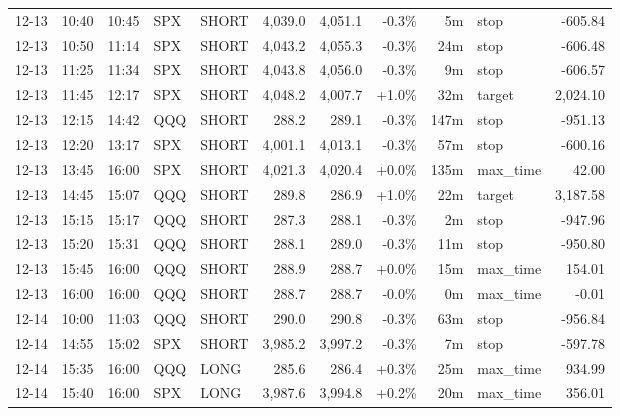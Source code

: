 \documentclass[11pt,a4paper,twoside]{article}
\begin{document}
\begin{center}
\begin{longtable}{>{\color{txtmain}}l l l l l r r r r >{\color{txtmain}}l r}
12-13 & 10:40 & 10:45 & SPX & SHORT & 4,039.0 & 4,051.1 & \textcolor{lossred}{-0.3\%} & 5m & stop & \textcolor{lossred}{-605.84} \\
12-13 & 10:50 & 11:14 & SPX & SHORT & 4,043.2 & 4,055.3 & \textcolor{lossred}{-0.3\%} & 24m & stop & \textcolor{lossred}{-606.48} \\
12-13 & 11:25 & 11:34 & SPX & SHORT & 4,043.8 & 4,056.0 & \textcolor{lossred}{-0.3\%} & 9m & stop & \textcolor{lossred}{-606.57} \\
12-13 & 11:45 & 12:17 & SPX & SHORT & 4,048.2 & 4,007.7 & \textcolor{wingreen}{+1.0\%} & 32m & target & \textcolor{wingreen}{2,024.10} \\
12-13 & 12:15 & 14:42 & QQQ & SHORT & 288.2 & 289.1 & \textcolor{lossred}{-0.3\%} & 147m & stop & \textcolor{lossred}{-951.13} \\
12-13 & 12:20 & 13:17 & SPX & SHORT & 4,001.1 & 4,013.1 & \textcolor{lossred}{-0.3\%} & 57m & stop & \textcolor{lossred}{-600.16} \\
12-13 & 13:45 & 16:00 & SPX & SHORT & 4,021.3 & 4,020.4 & \textcolor{wingreen}{+0.0\%} & 135m & max\_time & \textcolor{wingreen}{42.00} \\
12-13 & 14:45 & 15:07 & QQQ & SHORT & 289.8 & 286.9 & \textcolor{wingreen}{+1.0\%} & 22m & target & \textcolor{wingreen}{3,187.58} \\
12-13 & 15:15 & 15:17 & QQQ & SHORT & 287.3 & 288.1 & \textcolor{lossred}{-0.3\%} & 2m & stop & \textcolor{lossred}{-947.96} \\
12-13 & 15:20 & 15:31 & QQQ & SHORT & 288.1 & 289.0 & \textcolor{lossred}{-0.3\%} & 11m & stop & \textcolor{lossred}{-950.80} \\
12-13 & 15:45 & 16:00 & QQQ & SHORT & 288.9 & 288.7 & \textcolor{wingreen}{+0.0\%} & 15m & max\_time & \textcolor{wingreen}{154.01} \\
12-13 & 16:00 & 16:00 & QQQ & SHORT & 288.7 & 288.7 & \textcolor{lossred}{-0.0\%} & 0m & max\_time & \textcolor{lossred}{-0.01} \\
12-14 & 10:00 & 11:03 & QQQ & SHORT & 290.0 & 290.8 & \textcolor{lossred}{-0.3\%} & 63m & stop & \textcolor{lossred}{-956.84} \\
12-14 & 14:55 & 15:02 & SPX & SHORT & 3,985.2 & 3,997.2 & \textcolor{lossred}{-0.3\%} & 7m & stop & \textcolor{lossred}{-597.78} \\
12-14 & 15:35 & 16:00 & QQQ & LONG & 285.6 & 286.4 & \textcolor{wingreen}{+0.3\%} & 25m & max\_time & \textcolor{wingreen}{934.99} \\
12-14 & 15:40 & 16:00 & SPX & LONG & 3,987.6 & 3,994.8 & \textcolor{wingreen}{+0.2\%} & 20m & max\_time & \textcolor{wingreen}{356.01} \\

\end{longtable}
\end{center}
\end{document}
